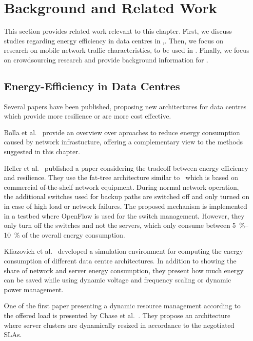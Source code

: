 \section{Background and Related Work}\label{sec:cloud:related_work}
This section provides related work relevant to this chapter.
First, we discuss studies regarding energy efficiency in data centres in ,.
Then, we focus on research on mobile network traffic characteristics, to be used in .
Finally, we focus on crowdsourcing research and provide background information for .

\subsection{Energy-Efficiency in Data Centres}
Several papers have been published, proposing new architectures for data centres which provide more resilience or are more cost effective\cite{Al-Fares2008, Greenberg2009a, Guo2009}.

Bolla et al.~\cite{Bolla2011} provide an overview over aproaches to reduce energy consumption caused by network infrastucture, offering a complementary view to the methods suggested in this chapter.  

Heller et al.~\cite{Heller2010} published a paper considering the tradeoff between energy efficiency and resilience.
They use the fat-tree architecture similar to~\cite{Al-Fares2008, Greenberg2009a} which is based on commercial of-the-shelf network equipment.
During normal network operation, the additional switches used for backup paths are switched off and only turned on in case of high load or network failures.
The proposed mechanism is implemented in a testbed where OpenFlow is used for the switch management.
However, they only turn off the switches and not the servers, which only consume between \SIrange{5}{10}{\percent} of the overall energy consumption.

Kliazovich et al.~\cite{Kliazovich2010} developed a simulation environment for computing the energy consumption of different data centre architectures. In addition to showing the share of network and server energy consumption, they present how much energy can be saved while using dynamic voltage and frequency scaling or dynamic power management.

One of the first paper presenting a dynamic resource management according to the offered load  is presented by Chase et al.~\cite{Chase2001}. They propose an architecture where server clusters are dynamically resized in accordance to the negotiated SLAs.

